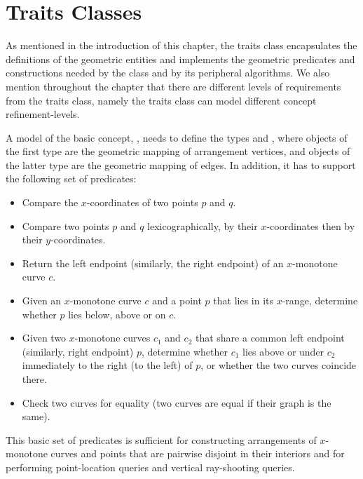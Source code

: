 \section{Traits Classes\label{arr_sec:traits}}

As mentioned in the introduction of this chapter, the traits class
encapsulates the definitions of the geometric entities and
implements the geometric predicates and constructions needed by
the  class and by its peripheral algorithms. We also
mention throughout the chapter that there are different levels of
requirements from the traits class, namely the traits class can model
different concept refinement-levels.

A model of the basic concept, ,
needs to define the types  and
, where objects of the first type are
the geometric mapping of arrangement vertices, and objects of the
latter type are the geometric mapping of edges. In addition, it has to
support the following set of predicates:
\begin{itemize}
\item Compare the $x$-coordinates of two points $p$ and $q$.
\item Compare two points $p$ and $q$ lexicographically, by their
$x$-coordinates then by their $y$-coordinates.
\item Return the left endpoint (similarly, the right endpoint) of
an $x$-monotone curve $c$.
\item Given an $x$-monotone curve $c$ and a point $p$ that lies in its
$x$-range, determine whether $p$ lies below, above or on $c$.
\item Given two $x$-monotone curves $c_1$ and $c_2$ that share a
common left endpoint (similarly, right endpoint) $p$, determine
whether $c_1$ lies above or under $c_2$ immediately to the right
(to the left) of $p$, or whether the two curves coincide there.
\item Check two curves for equality (two curves are equal if their
graph is the same).
\end{itemize}
This basic set of predicates is sufficient for constructing
arrangements of $x$-monotone curves and points that are pairwise
disjoint in their interiors and for performing point-location
queries and vertical ray-shooting queries.

